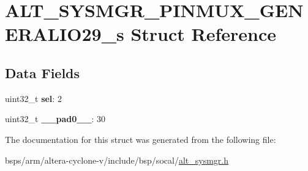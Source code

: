 \hypertarget{structALT__SYSMGR__PINMUX__GENERALIO29__s}{}\section{A\+L\+T\+\_\+\+S\+Y\+S\+M\+G\+R\+\_\+\+P\+I\+N\+M\+U\+X\+\_\+\+G\+E\+N\+E\+R\+A\+L\+I\+O29\+\_\+s Struct Reference}
\label{structALT__SYSMGR__PINMUX__GENERALIO29__s}
\subsection*{Data Fields}
\begin{DoxyCompactItemize}
\item 
\mbox{\label{structALT__SYSMGR__PINMUX__GENERALIO29__s_af8ceb3c0c7ee15569c9821d6ecbe34f2}} 
uint32\+\_\+t {\bfseries sel}\+: 2
\item 
\mbox{\label{structALT__SYSMGR__PINMUX__GENERALIO29__s_adfbad8ab53262ad7e3fce8bce83f9e6e}} 
uint32\+\_\+t {\bfseries \+\_\+\+\_\+pad0\+\_\+\+\_\+}\+: 30
\end{DoxyCompactItemize}


The documentation for this struct was generated from the following file\+:\begin{DoxyCompactItemize}
\item 
bsps/arm/altera-\/cyclone-\/v/include/bsp/socal/\mbox{\hyperlink{alt__sysmgr_8h}{alt\+\_\+sysmgr.\+h}}\end{DoxyCompactItemize}
